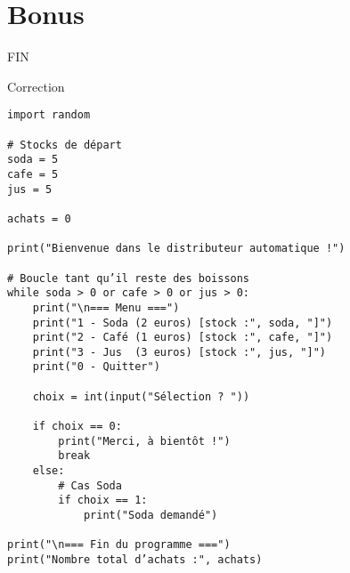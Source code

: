 \section{Bonus}


\begin{center}
\Large{FIN}
\end{center}

\cleardoublepage

\ifdef{\public}{}{\pagestyle{correction}}

\begin{center}
\Large{Correction}
\end{center}

\reponse{}

\begin{verbatim}
import random

# Stocks de départ
soda = 5
cafe = 5
jus = 5

achats = 0

print("Bienvenue dans le distributeur automatique !")

# Boucle tant qu’il reste des boissons
while soda > 0 or cafe > 0 or jus > 0:
    print("\n=== Menu ===")
    print("1 - Soda (2 euros) [stock :", soda, "]")
    print("2 - Café (1 euros) [stock :", cafe, "]")
    print("3 - Jus  (3 euros) [stock :", jus, "]")
    print("0 - Quitter")

    choix = int(input("Sélection ? "))

    if choix == 0:
        print("Merci, à bientôt !")
        break
    else:
        # Cas Soda
        if choix == 1:
            print("Soda demandé")

print("\n=== Fin du programme ===")
print("Nombre total d’achats :", achats)
\end{verbatim}

\reponse{}


